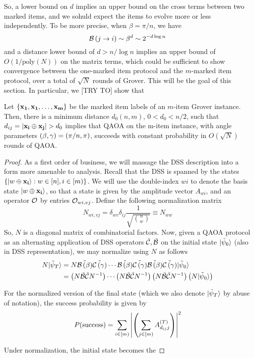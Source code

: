 \documentclass[11pt]{article}
\begin{document}
So, a lower bound on $d$ implies an upper bound on the cross terms between two marked items, and we sohuld expect the items to evolve more or less independently. To be more precise, when $\beta = \pi/ n$, we have
\begin{equation}
    \mathcal{B}\left(j\rightarrow i\right) \sim \beta^{d} \sim 2^{-d\log n} 
\end{equation}
and a distance lower bound of $d > n/\log n$ implies an upper bound of $O(1/\text{poly}(N))$ on the matrix terms, which could be sufficient to show convergence between the one-marked item protocol and the $m$-marked item protocol, over a total of $\sqrt{N}$ rounds of Grover. This will be the goal of this section. In particular, we [TRY TO] show that
\begin{theorem}
  Let $\left\{\mathbf{x_1},\mathbf{x_1},\ldots, \mathbf{x_m}\right\}$ be the marked item labels of an $m$-item Grover instance. Then, there is a minimum distance $d_0(n,m)$, $0 < d_0 < n/2$, such that $d_{ij} = |\mathbf{x_i}\oplus\mathbf{x_j}| > d_0$ implies that QAOA on the m-item instance, with angle parameters $\left(\beta, \gamma\right) = \left(\pi/n, \pi\right)$, succeeds with constant probability in $O(\sqrt{N})$ rounds of QAOA.
\end{theorem}
\begin{proof}
  As a first order of business, we will massage the DSS description into a form more amenable to analysis. Recall that the DSS is spanned by the states $\left\{|w\oplus\mathbf{x_i}\rangle: w\in [n], i\in [m)\right\}$. We will use the double-index $wi$ to denote the basis state $|w\oplus\mathbf{x_i}\rangle$, so that a state is given by the amplitude vector $A_{wi}$, and an operator $\mathcal{O}$ by entries $\mathcal{O}_{wi,vj}$. Define the following normalization matrix
  \begin{equation}
    \label{eq:Normalization}
    N_{wi, vj} = \delta_{wv}\delta_{ij}\frac{1}{\sqrt{\binom n w}} \equiv N_{ww}
  \end{equation}
So, $N$ is a diagonal matrix of combinatorial factors. Now, given a QAOA protocol as an alternating application of DSS operators $\tilde{\mathcal{C}},\tilde{\mathcal{B}}$ on the initial state $|\tilde{\psi}_0\rangle$ (also in DSS representation), we may normalize using $N$ as follows
\begin{align}
  N|\tilde{\psi}_T\rangle &= N \tilde{\mathcal{B}\left(\beta\right)}\tilde{\mathcal{C}\left(\gamma\right)}\cdots \tilde{\mathcal{B}\left(\beta\right)}\tilde{\mathcal{C}\left(\gamma\right)}\tilde{\mathcal{B}\left(\beta\right)}\tilde{\mathcal{C}\left(\gamma\right)}|\tilde{\psi}_0\rangle\\
  &= \left(N\tilde{\mathcal{B}}\tilde{\mathcal{C}}N^{-1}\right)\cdots \left(N\tilde{\mathcal{B}}\tilde{\mathcal{C}}N^{-1}\right)\left(N\tilde{\mathcal{B}}\tilde{\mathcal{C}}N^{-1}\right)\left(N|\tilde{\psi}_0\rangle\right)
\end{align}

For the normalized version of the final state (which we also denote $|\tilde{\psi}_T\rangle$ by abuse of notation), the success probability is given by
\begin{equation}
  P(\text{success}) = \sum\limits_{i\in [m)}^{}\left|\left(\sum\limits_{j\in [m)}^{}A^{(T)}_{d_{ij} j}\right)\right|^2
\end{equation}

Under normalization, the initial state becomes the 
\end{proof}
\end{document}
